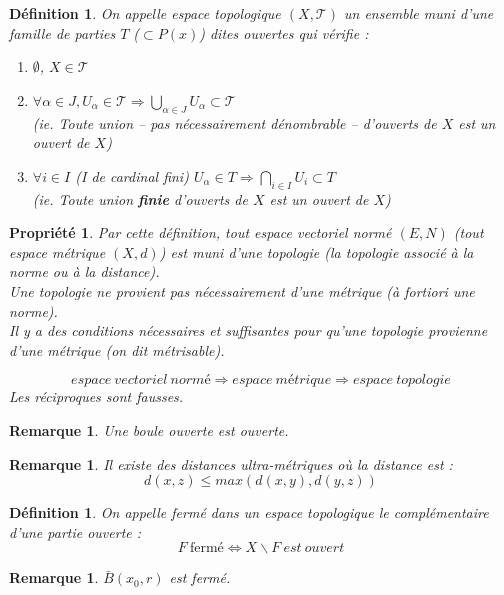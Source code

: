 \documentclass[a4paper, oneside]{report}
\theoremstyle{break}
\newtheorem{defi}[thm]{Définition}
\newtheorem{propr}[thm]{Propriété}
\newtheorem{remar}[thm]{Remarque}
\newcommand{\evn}{espace vectoriel normé }
\begin{document}
\begin{defi}                    
On appelle espace topologique $(X, \mathcal{T})$ un ensemble muni d'une famille de parties $T$ ($\subset P(x)$) dites ouvertes qui vérifie :
\begin{enumerate}
\item $\emptyset$, $X\in \mathcal{T}$
\item $ \forall \alpha\in J, U_\alpha \in \mathcal{T} \Rightarrow \bigcup_{\alpha \in J}U_\alpha \subset \mathcal{T}$ \\
  (ie. Toute union -- pas nécessairement dénombrable -- d'ouverts de $X$ est un ouvert de $X$)
\item $\forall i\in I$ (I de cardinal fini) $U_\alpha\in T \Rightarrow \bigcap_{i\in I}U_i\subset T$ \\
  (ie. Toute union \textbf{finie} d'ouverts de $X$ est un ouvert de $X$)
\end{enumerate}
\end{defi}


\begin{propr}
Par cette définition, tout \evn $(E, N)$ (tout espace métrique $(X,d)$) est muni d'une topologie (la topologie associé à la norme ou à la distance).\\
Une topologie ne provient pas nécessairement d'une métrique (à fortiori une norme).\\
Il y a des conditions nécessaires et suffisantes pour qu'une topologie provienne d'une métrique (on dit métrisable).

$$ espace~vectoriel~normé \Rightarrow espace~métrique \Rightarrow espace~topologie $$
Les réciproques sont fausses.
\end{propr}


\begin{remar}
Une boule ouverte est ouverte.
\end{remar}


\begin{remar}
Il existe des distances ultra-métriques où la distance est :
$$d(x,z)\leq max(d(x,y),d(y,z))$$
\end{remar}


\begin{defi}                    
On appelle fermé dans un espace topologique le complémentaire d'une partie ouverte :
$$F~\text{fermé} \Leftrightarrow X\backslash F~est~ouvert$$
\end{defi}

\begin{remar}
$\bar{B}(x_0,r)$ est fermé.
\end{remar}
\end{document}
